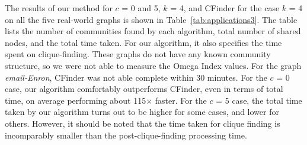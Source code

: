 The results of our method for $c$ = 0 and 5, $k$ = 4, and CFinder for the case $k$ = 4 on all the five real-world graphs is shown in  Table~\ref{tab:applications3}. The table lists the number of communities found by each algorithm, total number of shared nodes, and the total time taken. For our algorithm, it also specifies the time spent on clique-finding. These graphs do not have any known community structure, so we were not able to measure the Omega Index values. For the graph {\em email-Enron}, CFinder was not able complete within 30 minutes. For the $c$ = 0 case, our algorithm comfortably outperforms CFinder, even in terms of total time, on average performing about 115$\times$ faster. For the $c$ = 5 case, the total time taken by our algorithm turns out to be higher for some cases, and lower for others. However, it should be noted that the time taken for clique finding is incomparably smaller than the post-clique-finding processing time. 









